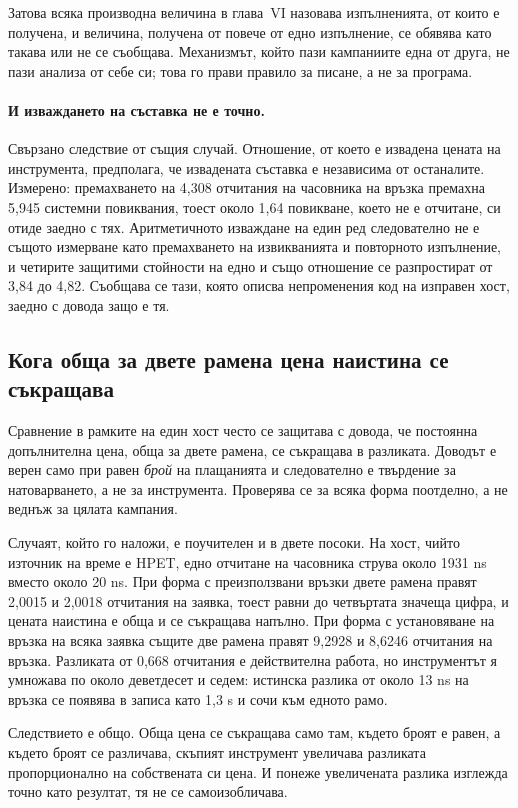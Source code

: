 Затова всяка производна величина в глава~VI назовава изпълненията, от които е получена, и
величина, получена от повече от едно изпълнение, се обявява като такава или не се съобщава.
Механизмът, който пази кампаниите една от друга, не пази анализа от себе си; това го прави
правило за писане, а не за програма.

\paragraph{И изваждането на съставка не е точно.} Свързано следствие от същия случай. Отношение,
от което е извадена цената на инструмента, предполага, че извадената съставка е независима от
останалите. Измерено: премахването на 4,308 отчитания на часовника на връзка премахна 5,945
системни повиквания, тоест около 1,64 повикване, което не е отчитане, си отиде заедно с тях.
Аритметичното изваждане на един ред следователно не е същото измерване като премахването на
извикванията и повторното изпълнение, и четирите защитими стойности на едно и също отношение
се разпростират от 3,84 до 4,82. Съобщава се тази, която описва непроменения код на изправен
хост, заедно с довода защо е тя.

\subsection{Кога обща за двете рамена цена наистина се съкращава}

Сравнение в рамките на един хост често се защитава с довода, че постоянна допълнителна цена,
обща за двете рамена, се съкращава в разликата. Доводът е верен само при равен \emph{брой}
на плащанията и следователно е твърдение за натоварването, а не за инструмента. Проверява се
за всяка форма поотделно, а не веднъж за цялата кампания.

Случаят, който го наложи, е поучителен и в двете посоки. На хост, чийто източник на време е
HPET, едно отчитане на часовника струва около 1931 ns вместо около 20 ns. При форма с
преизползвани връзки двете рамена правят 2,0015 и 2,0018 отчитания на заявка, тоест равни до
четвъртата значеща цифра, и цената наистина е обща и се съкращава напълно. При форма с
установяване на връзка на всяка заявка същите две рамена правят 9,2928 и 8,6246 отчитания на
връзка. Разликата от 0,668 отчитания е действителна работа, но инструментът я умножава по
около деветдесет и седем: истинска разлика от около 13 ns на връзка се появява в записа като
1,3 \textmu s и сочи към едното рамо.

Следствието е общо. Обща цена се съкращава само там, където броят е равен, а където броят се
различава, скъпият инструмент увеличава разликата пропорционално на собствената си цена. И
понеже увеличената разлика изглежда точно като резултат, тя не се самоизобличава.

